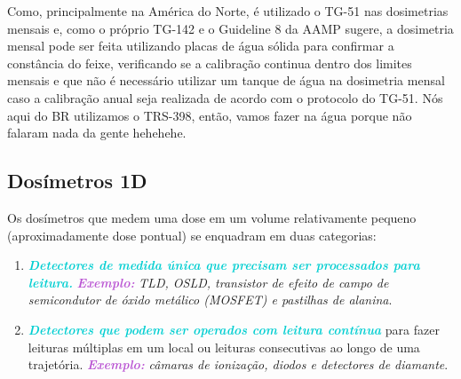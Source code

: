 \documentclass[11pt,a4paper]{article}
\begin{document}
	\begin{tcolorbox}[width=\textwidth, colback={white}, colbacktitle={DarkTurquoise!50!white}, title={$\bigstar$ \LobsterTwo{Observação:} $\bigstar$}, coltitle={CarnationPink}, colframe={DarkTurquoise}, fonttitle=\rmfamily\bfseries\Large, breakable]
		Como, principalmente na América do Norte, é utilizado o TG-51 nas dosimetrias mensais e, como o próprio TG-142 e o Guideline 8 da AAMP sugere, a dosimetria mensal pode ser feita utilizando placas de água sólida para confirmar a constância do feixe, verificando se a calibração continua dentro dos limites mensais e que não é necessário utilizar um tanque de água na dosimetria mensal caso a calibração anual seja realizada de acordo com o protocolo do TG-51. Nós aqui do BR utilizamos o TRS-398, então, vamos fazer na água porque não falaram nada da gente hehehehe.
	\end{tcolorbox}

\subsection*{Dosímetros 1D}

	Os dosímetros que medem uma dose em um volume relativamente pequeno (aproximadamente dose pontual) se enquadram em duas categorias:

	\begin{enumerate}
		\item \textcolor{DarkTurquoise}{\textbf{\textit{Detectores de medida única que precisam ser processados para leitura.}}} \textcolor{MediumOrchid}{\textbf{\textit{Exemplo:}}} \textit{TLD, OSLD, transistor de efeito de campo de semicondutor de óxido metálico (MOSFET) e pastilhas de alanina}. 
		\item \textcolor{DarkTurquoise}{\textbf{\textit{Detectores que podem ser operados com leitura contínua}}} para fazer leituras múltiplas em um local ou leituras consecutivas ao longo de uma trajetória. \textcolor{MediumOrchid}{\textbf{\textit{Exemplo:}}} \textit{câmaras de ionização, diodos e detectores de diamante}.
	\end{enumerate}
\end{document}
